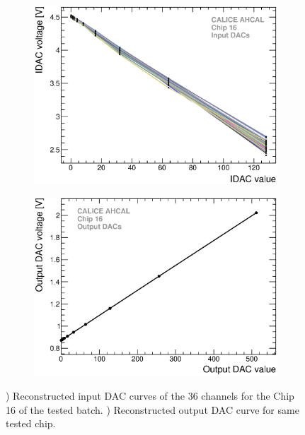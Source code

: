 \begin{figure}[htbp!]
  \centering
  \begin{subfigure}[t]{0.49\textwidth}
    \includegraphics[width=1.\linewidth]{../Thesis_Plots/Commissioning/Plots/IDACs_Chip16.eps}
    \caption{} \label{fig:IDAC}
  \end{subfigure}
  \hfill
  \begin{subfigure}[t]{0.49\textwidth}
    \includegraphics[width=1.\linewidth]{../Thesis_Plots/Commissioning/Plots/OutDACs_Chip16.eps}
    \caption{} \label{fig:OutDAC}
  \end{subfigure}
  \caption{) Reconstructed input DAC curves of the 36 channels for the Chip 16 of the tested batch. ) Reconstructed output DAC curve for same tested chip.}
\end{figure}

